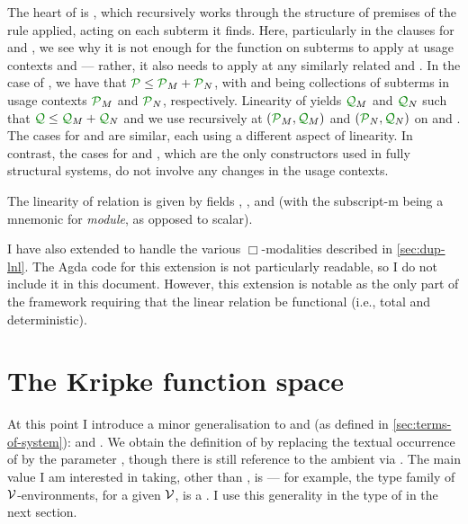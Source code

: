 The heart of  is , which recursively
works through the structure  of premises of the rule applied,
acting on each subterm it finds.
Here, particularly in the clauses for  and
, we see why it is not enough for the
function on subterms to apply at usage contexts  and 
--- rather, it also needs to apply at any similarly related 
and .
In the case of , we have that
$\grP \leq \grP_M + \grP_N$, with  and  being
collections of subterms in usage contexts $\grP_M$ and $\grP_N$, respectively.
Linearity of \AgdaBound{$\Psi$} yields $\grQ_M$ and $\grQ_N$ such that
$\grQ \leq \grQ_M + \grQ_N$ and we use  recursively at
$(\grP_M, \grQ_M)$ and $(\grP_N, \grQ_N)$ on  and .
The cases for  and
 are similar, each using a different aspect
of linearity.
In contrast, the cases for  and
, which are the only constructors used in fully structural
systems, do not involve any changes in the usage contexts.

The linearity of relation \AgdaBound{$\Psi$} is given by fields
, , and  (with
the subscript-m being a mnemonic for \emph{module}, as opposed to scalar).


I have also extended  to handle the various
$\Box$-modalities described in \cref{sec:dup-lnl}.
The Agda code for this extension is not particularly readable, so I do not
include it in this document.
However, this extension is notable as the only part of the framework requiring
that the linear relation \AgdaBound{$\Psi$} be functional (i.e., total and
deterministic).

\section{The Kripke function space}\label{sec:kripke}

At this point I introduce a minor generalisation to
 and  (as defined in
\cref{sec:terms-of-system}):
\AgdaSpace{} and
\AgdaSpace{}.  We obtain the
definition of \AgdaSpace{} by
replacing the textual occurrence of  by the parameter
, though there is still reference to the ambient 
via .
The main value I am interested in  taking, other than
, is  --- for example, the type family of
$\mathcal V$-environments, for a given $\mathcal V$, is a
\AgdaSpace{}%
\AgdaSpace{}\AgdaSymbol{\_}.
I use this generality in the type of  in the next section.

